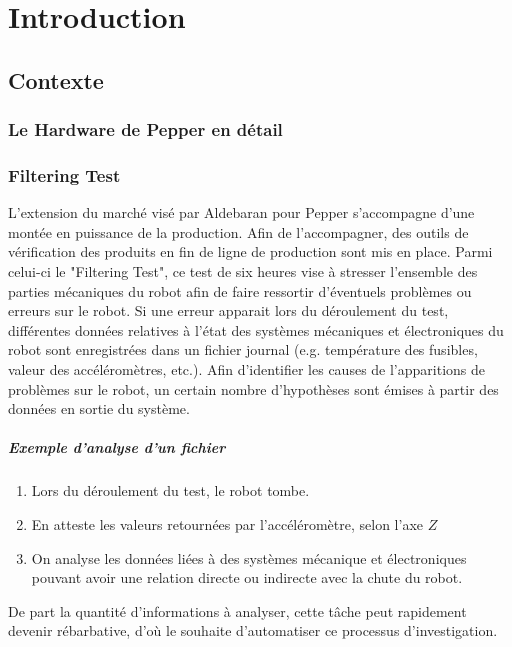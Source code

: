 \chapter{Introduction}
\label{Introduction}
\thispagestyle{fancy}

\section{Contexte}
\label{Introduction:Contexte}

\subsection{Le Hardware de Pepper en détail}
\label{Introduction:Contexte:Filtering Test}

\subsection{Filtering Test}
\label{Introduction:Contexte:Filtering Test}
L'extension du marché visé par Aldebaran pour Pepper s'accompagne d'une montée en puissance de la production. Afin de l'accompagner, des outils de vérification des produits en fin de ligne de production sont mis en place. Parmi celui-ci le "Filtering Test", ce test de six heures vise à stresser l'ensemble des parties mécaniques du robot afin de faire ressortir d'éventuels problèmes ou erreurs sur le robot. Si une erreur apparait lors du déroulement du test, différentes données relatives à l'état des systèmes mécaniques et électroniques du robot sont enregistrées dans un fichier journal (e.g. température des fusibles, valeur des accéléromètres, etc.). Afin d'identifier les causes de l'apparitions de problèmes sur le robot, un certain nombre d'hypothèses sont émises à partir des données en sortie du système. 

\paragraph{Exemple d'analyse d'un fichier}
\begin{enumerate}
	\item Lors du déroulement du test, le robot tombe.
	\item En atteste les valeurs retournées par l'accéléromètre, selon l'axe $Z$
	\item On analyse les données liées à des systèmes mécanique et électroniques pouvant avoir une relation directe ou indirecte avec la chute du robot.  
\end{enumerate}


De part la quantité d'informations à analyser, cette tâche peut rapidement devenir rébarbative, d'où le souhaite d'automatiser ce processus d'investigation.

